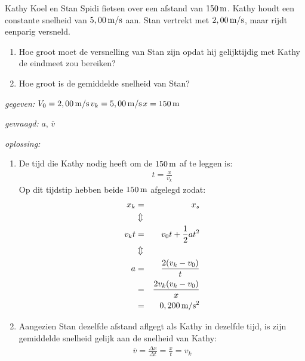 \documentclass{ximera}
\begin{document}
\begin{exercise} Kathy Koel en Stan Spidi fietsen over een afstand van $150\rm\,m$. Kathy houdt een constante snelheid van $5,00\rm\,m/s$ aan. Stan vertrekt met $2,00\rm\,m/s$, maar rijdt eenparig versneld.
\begin{enumerate}
\item Hoe groot moet de versnelling van Stan zijn opdat hij gelijktijdig met Kathy de eindmeet zou bereiken?
\item Hoe groot is de gemiddelde snelheid van Stan?
\end{enumerate}
\begin{oplossing}
\item[\textit{gegeven:}]$V_0=2,00\rm\,m/s$\newline$v_k=5,00\rm\,m/s$\newline$x=150\rm\,m$
\item [\textit{gevraagd:}]$a$, $\overline{v}$
\item [\textit{oplossing:}]
\begin{enumerate}
\item De tijd die Kathy nodig heeft om de
$150\rm\,m$ af te leggen is:
\begin{eqnarray*}
t=\frac{x}{v_k}
\end{eqnarray*}
Op dit tijdstip hebben beide $150\rm\,m$ afgelegd zodat:
\begin{eqnarray*}
x_k&=&x_s\\
&\Updownarrow&\\
v_kt&=&v_0t+\frac{1}{2}at^2\\
&\Updownarrow&\\
a&=&\frac{2(v_k-v_0)}{t}\\
&=&\frac{2v_k(v_k-v_0)}{x}\\
&=&0,200\rm\,m/s^2
\end{eqnarray*}
\item Aangezien Stan dezelfde afstand aflgegt als Kathy in dezelfde tijd, is
zijn gemiddelde snelheid gelijk aan de snelheid van Kathy:
\begin{eqnarray*}
\overline{v}=\frac{\Delta x}{\Delta t}=\frac{x}{t}=v_k
\end{eqnarray*}
\end{enumerate}
\end{oplossing}



\end{exercise}
\end{document}
